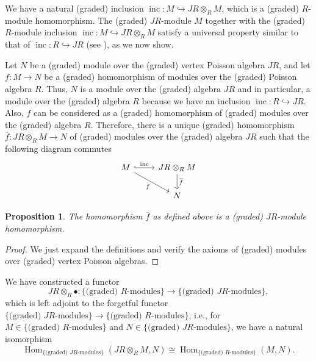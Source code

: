 \documentclass[a4paper, 12pt, reqno]{amsart}
\newtheorem{proposition}[theorem]{Proposition}
\theoremstyle{remark}
\DeclareMathOperator{\Hom}{Hom}
\DeclareMathOperator{\inc}{inc}
\begin{document}
We have a natural (graded) inclusion $\inc: M \hookrightarrow JR \otimes_R M$, which is a (graded) $R$-module homomorphism.
The (graded) $JR$-module $M$ together with the (graded) $R$-module inclusion $\inc: M \hookrightarrow JR \otimes_R M$ satisfy a universal property similar to that of $\inc: R \hookrightarrow JR$ (see ), as we now show.

Let $N$ be a (graded) module over the (graded) vertex Poisson algebra $JR$, and let $f: M \to N$ be a (graded) homomorphism of modules over the (graded) Poisson algebra $R$.
Thus, $N$ is a module over the (graded) algebra $JR$ and in particular, a module over the (graded) algebra $R$ because we have an inclusion $\inc: R \hookrightarrow JR$.
Also, $f$ can be considered as a (graded) homomorphism of (graded) modules over the (graded) algebra $R$.
Therefore, there is a unique (graded) homomorphism $\overline{f}: JR \otimes_R M \to N$ of (graded) modules over the (graded) algebra $JR$ such that the following diagram commutes
\begin{equation*}
  \begin{tikzcd}
    M \arrow[r, "\inc", hook] \arrow[rd, "f"'] & JR \otimes_R M \arrow[d, "\overline{f}"] \\
    & N
  \end{tikzcd}
\end{equation*}

\begin{proposition}
  \label{prp:12}
  The homomorphism $\overline{f}$ as defined above is a (graded) $JR$-module homomorphism.
\end{proposition}

\begin{proof}
  We just expand the definitions and verify the axioms of (graded) modules over (graded) vertex Poisson algebras.
\end{proof}

We have constructed a functor
\begin{equation*}
  JR \otimes_R \bullet: \{\text{(graded) $R$-modules}\} \to \{\text{(graded) $JR$-modules}\},
\end{equation*}
which is left adjoint to the forgetful functor $\{\text{(graded) $JR$-modules}\} \to \{\text{(graded) $R$-modules}\}$, i.e., for $M \in \{\text{(graded) $R$-modules}\}$ and $N \in \{\text{(graded) $JR$-modules}\}$, we have a natural isomorphism
\begin{equation*}
  \Hom_{\{\text{(graded) $JR$-modules}\}}(JR \otimes_R M, N) \cong \Hom_{\{\text{(graded) $R$-modules}\}}(M, N).
\end{equation*}
\end{document}
